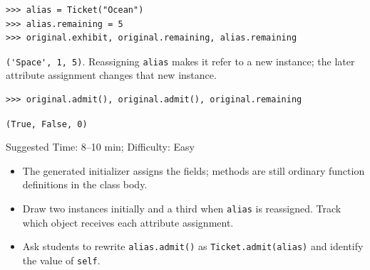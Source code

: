 \begin{blocksection}
\begin{lstlisting}
>>> alias = Ticket("Ocean")
>>> alias.remaining = 5
>>> original.exhibit, original.remaining, alias.remaining
\end{lstlisting}
\begin{solution}[.4in]
\lstinline{('Space', 1, 5)}. Reassigning \lstinline{alias} makes it refer to
a new instance; the later attribute assignment changes that new instance.
\end{solution}
\end{blocksection}

\begin{blocksection}
\begin{lstlisting}
>>> original.admit(), original.admit(), original.remaining
\end{lstlisting}
\begin{solution}[.35in]
\lstinline{(True, False, 0)}
\end{solution}
\end{blocksection}

\begin{questionmeta}
Suggested Time: 8--10 min; Difficulty: Easy
\begin{itemize}
    \item The generated initializer assigns the fields; methods are still
    ordinary function definitions in the class body.
    \item Draw two instances initially and a third when \lstinline{alias} is
    reassigned. Track which object receives each attribute assignment.
    \item Ask students to rewrite \lstinline{alias.admit()} as
    \lstinline{Ticket.admit(alias)} and identify the value of \lstinline{self}.
\end{itemize}
\end{questionmeta}

